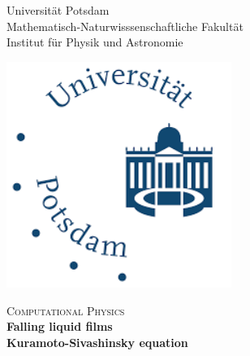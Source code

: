 \begin{titlepage}

\begin{center}



\begin{minipage}{0.57\textwidth}
\begin{flushleft}\large
\begin{center}
Universität Potsdam\\
Mathematisch-Naturwisssenschaftliche Fakultät\\
Institut für Physik und Astronomie\\
\end{center}
\end{flushleft}
\end{minipage}
\hfill
\begin{minipage}{0.42\textwidth}
\begin{flushright}
\begin{center}
\includegraphics[width=0.55\textwidth]{logo.png}\\ 
\end{center}
\end{flushright}
\end{minipage}
\vfill
\vspace*{0.5cm}
\textsc{\large Computational Physics}\\[0.5cm]


{ \Huge \bfseries Falling liquid films \\
Kuramoto-Sivashinsky equation}\\[0.4cm]

\vspace*{2.5cm}


\end{center}
\end{titlepage}

